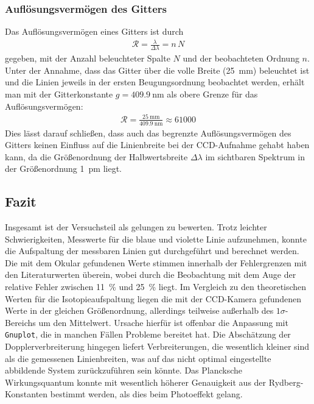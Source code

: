 \documentclass[11pt, a4paper]{article}
\numberwithin{equation}{section}
\begin{document}
\subsubsection{Auflösungsvermögen des Gitters}
Das Auflösungsvermögen eines Gitters ist durch
\begin{align*}
\mathcal{R}=\frac{\lambda}{\Delta\lambda}=n\,N
\end{align*}
gegeben, mit der Anzahl beleuchteter Spalte $N$ und der beobachteten Ordnung $n$. Unter der Annahme, dass das Gitter über die volle Breite (\SI{25}{\milli\metre}) beleuchtet ist und die Linien jeweils in der ersten Beugungsordnung beobachtet werden, erhält man mit der Gitterkonstante $g=\SI{409.9}{\nano\metre}$ als obere Grenze für das Auflösungsvermögen:
\begin{align*}
\mathcal{R} = \frac{\SI{25}{\milli\metre}}{\SI{409.9}{\nano\metre}} \approx 61000
\end{align*}
Dies lässt darauf schließen, dass auch das begrenzte Auflösungsvermögen des Gitters keinen Einfluss auf die Linienbreite bei der CCD-Aufnahme gehabt haben kann, da die Größenordnung der Halbwertsbreite $\Delta \lambda$ im sichtbaren Spektrum in der Größenordnung \SI{1}{\pico\metre} liegt.

\subsection{Fazit}
Insgesamt ist der Versuchsteil als gelungen zu bewerten.
Trotz leichter Schwierigkeiten, Messwerte für die blaue und violette Linie aufzunehmen, konnte die Aufspaltung der messbaren Linien gut durchgeführt und berechnet werden.
Die mit dem Okular gefundenen Werte stimmen innerhalb der Fehlergrenzen mit den Literaturwerten überein, wobei durch die Beobachtung mit dem Auge der relative Fehler zwischen \SI{11}{\percent} und \SI{25}{\percent} liegt.
Im Vergleich zu den theoretischen Werten für die Isotopieaufspaltung liegen die mit der CCD-Kamera gefundenen Werte in der gleichen Größenordnung, allerdings teilweise außerhalb des $1\sigma$-Bereichs um den Mittelwert.
Ursache hierfür ist offenbar die Anpassung mit \texttt{Gnuplot}, die in manchen Fällen Probleme bereitet hat.
Die Abschätzung der Dopplerverbreiterung hingegen liefert Verbreiterungen, die wesentlich kleiner sind als die gemessenen Linienbreiten, was auf das nicht optimal eingestellte abbildende System zurückzuführen sein könnte.
Das Plancksche Wirkungsquantum konnte mit wesentlich höherer Genauigkeit aus der Rydberg-Konstanten bestimmt werden, als dies beim Photoeffekt gelang.
\end{document}
